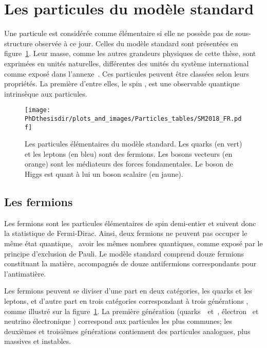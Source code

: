 \section{Les particules du modèle standard}\label{chapter-MS-MSSM-section-SM_ptcs}
Une particule est considérée comme élémentaire si elle ne possède pas de sous-structure observée à ce jour. %
Celles du modèle standard sont présentées en figure~\ref{fig-MS-table}.
Leur masse, comme les autres grandeurs physiques de cette thèse, sont exprimées en unités naturelles,
différentes des unités du système international comme exposé dans l'annexe~.
Ces particules peuvent être classées selon leurs propriétés.
La première d'entre elles, le \og spin \fg, est une observable quantique intrinsèque aux particules.
\begin{figure}[h]
\centering
\texttt{[image: \\PhDthesisdir/plots\_and\_images/Particles\_tables/SM2018\_FR.pdf]}
\caption[Les particules élémentaires du modèle standard.]{Les particules élémentaires du modèle standard. Les quarks (en vert) et les leptons (en bleu) sont des fermions. Les bosons vecteurs (en orange) sont les médiateurs des forces fondamentales. Le boson de Higgs est quant à lui un boson scalaire (en jaune).}
\label{fig-MS-table}
\end{figure}

\subsection{Les fermions}\label{chapter-MS-MSSM-section-SM_ptcs-subsec-fermions}
Les fermions sont les particules élémentaires de spin demi-entier et suivent donc la statistique de Fermi-Dirac.
Ainsi, deux fermions ne peuvent pas occuper le même état quantique,
\ie\ avoir les mêmes nombres quantiques,
comme exposé par le principe d'exclusion de Pauli.
Le modèle standard comprend douze fermions constituant la matière, accompagnés de douze antifermions correspondants pour l'antimatière.
\par Les fermions peuvent se diviser d'une part en deux catégories, les quarks et les leptons, et d'autre part en trois catégories correspondant à trois \og générations \fg, comme illustré sur la figure~\ref{fig-MS-table}. La première génération (quarks~\quarku\ et~\quarkd, électron \electron\ et neutrino électronique \nuele) correspond aux particules les plus communes; les deuxièmes et troisièmes générations contiennent des particules analogues, plus massives et instables.

